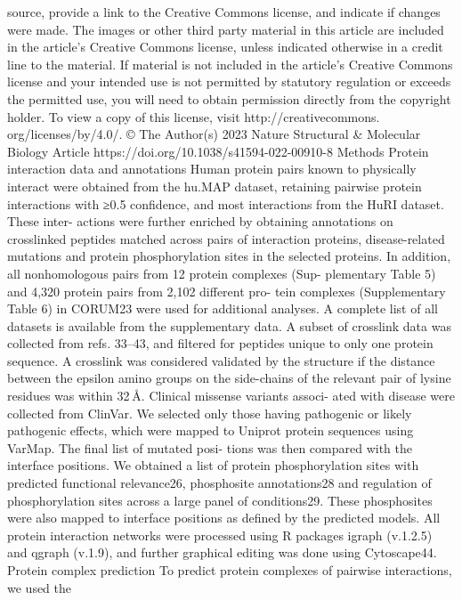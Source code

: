 source, provide a link to the Creative Commons license, and indicate
if changes were made. The images or other third party material in this
article are included in the article’s Creative Commons license, unless
indicated otherwise in a credit line to the material. If material is not
included in the article’s Creative Commons license and your intended
use is not permitted by statutory regulation or exceeds the permitted
use, you will need to obtain permission directly from the copyright
holder. To view a copy of this license, visit http://creativecommons.
org/licenses/by/4.0/.
© The Author(s) 2023
Nature Structural \& Molecular Biology
Article
https://doi.org/10.1038/s41594-022-00910-8
Methods
Protein interaction data and annotations
Human protein pairs known to physically interact were obtained from
the hu.MAP dataset, retaining pairwise protein interactions with ≥0.5
confidence, and most interactions from the HuRI dataset. These inter-
actions were further enriched by obtaining annotations on crosslinked
peptides matched across pairs of interaction proteins, disease-related
mutations and protein phosphorylation sites in the selected proteins.
In addition, all nonhomologous pairs from 12 protein complexes (Sup-
plementary Table 5) and 4,320 protein pairs from 2,102 different pro-
tein complexes (Supplementary Table 6) in CORUM23 were used for
additional analyses. A complete list of all datasets is available from
the supplementary data. A subset of crosslink data was collected from
refs. 33–43, and filtered for peptides unique to only one protein sequence.
A crosslink was considered validated by the structure if the distance
between the epsilon amino groups on the side-chains of the relevant
pair of lysine residues was within 32 Å. Clinical missense variants associ-
ated with disease were collected from ClinVar. We selected only those
having pathogenic or likely pathogenic effects, which were mapped to
Uniprot protein sequences using VarMap. The final list of mutated posi-
tions was then compared with the interface positions. We obtained a list
of protein phosphorylation sites with predicted functional relevance26,
phosphosite annotations28 and regulation of phosphorylation sites
across a large panel of conditions29. These phosphosites were also
mapped to interface positions as defined by the predicted models.
All protein interaction networks were processed using R packages
igraph (v.1.2.5) and qgraph (v.1.9), and further graphical editing was
done using Cytoscape44.
Protein complex prediction
To predict protein complexes of pairwise interactions, we used the
